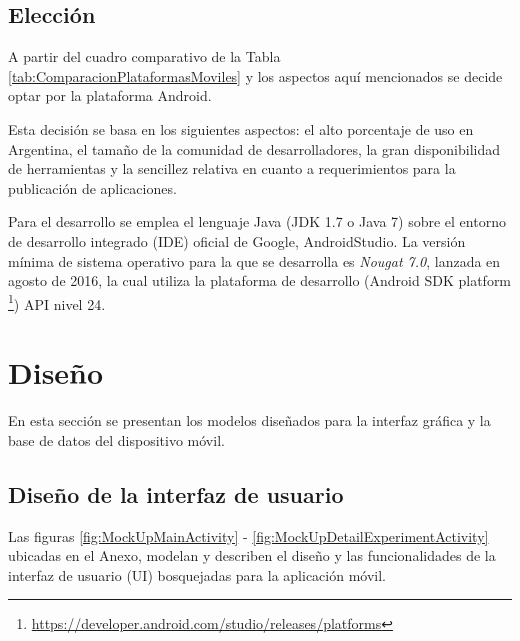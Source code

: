     
    \subsection{Elección}
    \par
    A partir del cuadro comparativo de la Tabla \ref{tab:ComparacionPlataformasMoviles} y los aspectos aquí mencionados se decide optar por la plataforma Android. 
    \par
    Esta decisión se basa en los siguientes aspectos: el alto porcentaje de uso en Argentina, el tamaño de la comunidad de desarrolladores, la gran disponibilidad de herramientas y la sencillez relativa en cuanto a requerimientos para la publicación de aplicaciones.
    
    \par Para el desarrollo se emplea el lenguaje Java (JDK 1.7 o Java 7) sobre el entorno de desarrollo integrado (IDE) oficial de Google, AndroidStudio. La versión mínima de sistema operativo para la que se desarrolla es \textit{Nougat 7.0}, lanzada en agosto de 2016, la cual utiliza la plataforma de desarrollo (Android SDK platform \footnote{\url{https://developer.android.com/studio/releases/platforms}}) API nivel 24.

    
    
\section{Diseño}
    
    \par En esta sección se presentan los modelos diseñados para la interfaz gráfica y la base de datos del dispositivo móvil.
    
    \subsection{Diseño de la interfaz de usuario}
        \par Las figuras \ref{fig:MockUpMainActivity} - %
        \ref{fig:MockUpDetailExperimentActivity} ubicadas en el Anexo, modelan y describen el diseño y las funcionalidades de la interfaz de usuario (UI) bosquejadas para la aplicación móvil.

